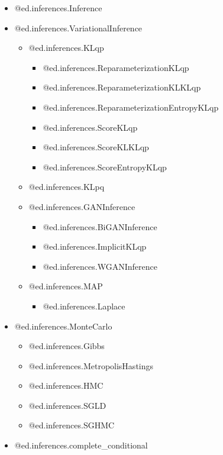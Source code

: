 \begin{itemize}
  \item @{ed.inferences.Inference}
  \item @{ed.inferences.VariationalInference}
    \begin{itemize}
    \item @{ed.inferences.KLqp}
      \begin{itemize}
      \item @{ed.inferences.ReparameterizationKLqp}
      \item @{ed.inferences.ReparameterizationKLKLqp}
      \item @{ed.inferences.ReparameterizationEntropyKLqp}
      \item @{ed.inferences.ScoreKLqp}
      \item @{ed.inferences.ScoreKLKLqp}
      \item @{ed.inferences.ScoreEntropyKLqp}
      \end{itemize}
    \item @{ed.inferences.KLpq}
    \item @{ed.inferences.GANInference}
      \begin{itemize}
      \item @{ed.inferences.BiGANInference}
      \item @{ed.inferences.ImplicitKLqp}
      \item @{ed.inferences.WGANInference}
      \end{itemize}
    \item @{ed.inferences.MAP}
      \begin{itemize}
      \item @{ed.inferences.Laplace}
      \end{itemize}
    \end{itemize}
  \item @{ed.inferences.MonteCarlo}
    \begin{itemize}
    \item @{ed.inferences.Gibbs}
    \item @{ed.inferences.MetropolisHastings}
    \item @{ed.inferences.HMC}
    \item @{ed.inferences.SGLD}
    \item @{ed.inferences.SGHMC}
    \end{itemize}
  \item @{ed.inferences.complete_conditional}
\end{itemize}

